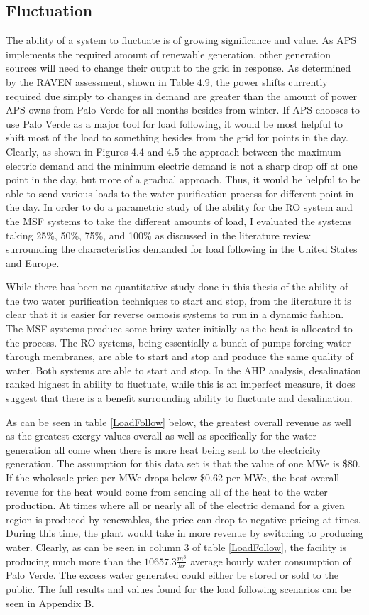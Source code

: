 \documentclass[12pt]{UIdahoMastersThesis}
\begin{document}
\subsection{Fluctuation}
The ability of a system to fluctuate is of growing significance and value.  As APS implements the required amount of renewable generation, other generation sources will need to change their output to the grid in response. As determined by the RAVEN assessment, shown in Table 4.9, the power shifts currently required due simply to changes in demand are greater than the amount of power APS owns from Palo Verde for all months besides from winter.  If APS chooses to use Palo Verde as a major tool for load following, it would be most helpful to shift most of the load to something besides from the grid for points in the day.  Clearly, as shown in Figures 4.4 and 4.5 the approach between the maximum electric demand and the minimum electric demand is not a sharp drop off at one point in the day, but more of a gradual approach. Thus, it would be helpful to be able to send various loads to the water purification process for different point in the day. In order to do a parametric study of the ability for the RO system and the MSF systems to take the different amounts of load, I evaluated the systems taking 25\%, 50\%, 75\%, and 100\% as discussed in the literature review surrounding the characteristics demanded for load following in the United States and Europe.

While there has been no quantitative study done in this thesis of the ability of the two water purification techniques to start and stop, from the literature it is clear that it is easier for reverse osmosis systems to run in a dynamic fashion.  The MSF systems produce some briny water initially as the heat is allocated to the process.  The RO systems, being essentially a bunch of pumps forcing water through membranes, are able to start and stop and produce the same quality of water.  Both systems are able to start and stop.  In the AHP analysis, desalination ranked highest in ability to fluctuate, while this is an imperfect measure, it does suggest that there is a benefit surrounding ability to fluctuate and desalination.

As can be seen in table \ref{LoadFollow} below, the greatest overall revenue as well as the greatest exergy values overall as well as specifically for the water generation all come when there is more heat being sent to the electricity generation.  The assumption for this data set is that the value of one MWe is \$80.  If the wholesale price per MWe drops below \$0.62 per MWe, the best overall revenue for the heat would come from sending all of the heat to the water production. At times where all or nearly all of the electric demand for a given region is produced by renewables, the price can drop to negative pricing at times.  During this time, the plant would take in more revenue by switching to producing water. Clearly, as can be seen in column 3 of table \ref{LoadFollow}, the facility is producing much more than the $10657.3 \frac{m^3}{hr}$ average hourly water consumption of Palo Verde.   The excess water generated could either be stored or sold to the public. The full results and values found for the load following scenarios can be seen in Appendix B. 
\end{document}
